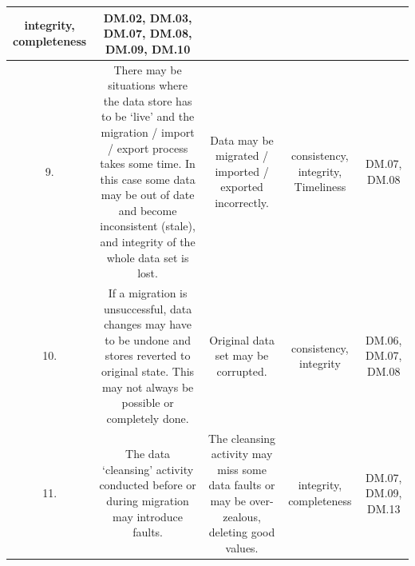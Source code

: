 \begin{longtable}{|C{}|C{}|C{}|C{}|C{}|}
\Gls{integrity}, \gls{completeness}&
DM.02, DM.03, DM.07, DM.08, DM.09, DM.10\\\hline
%
9.&
There may be situations where the data store has to be ‘live’ and the migration / import / export process takes some time.
In this case some data may be out of date and become inconsistent (stale), and \gls{integrity} of the whole data set is lost.&
Data may be migrated / imported / exported incorrectly.&
\Gls{consistency}, \gls{integrity}, Timeliness&
DM.07, DM.08\\\hline
%
10.&
If a migration is unsuccessful, data changes may have to be undone and stores reverted to original state.
This may not always be possible or completely done.&
Original data set may be corrupted.&
\Gls{consistency}, \Gls{integrity}&
DM.06, DM.07, DM.08\\\hline
%
11.&
The data ‘cleansing’ activity conducted before or during migration may introduce faults.&
The cleansing activity may miss some data faults or may be over-zealous, deleting good values.&
\Gls{integrity}, \gls{completeness}&
DM.07, DM.09, DM.13\\\hline
\end{longtable}
